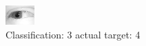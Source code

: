 \begin{figure}[h!]
\begin{center}
\includegraphics[width=0.60\columnwidth]{figures/ID2419_class_3_target_4.png}
\end{center}
\caption{ Classification: 3 actual target: 4}
\label{fig:ID2419_class_3_target_4}
\end{figure}
